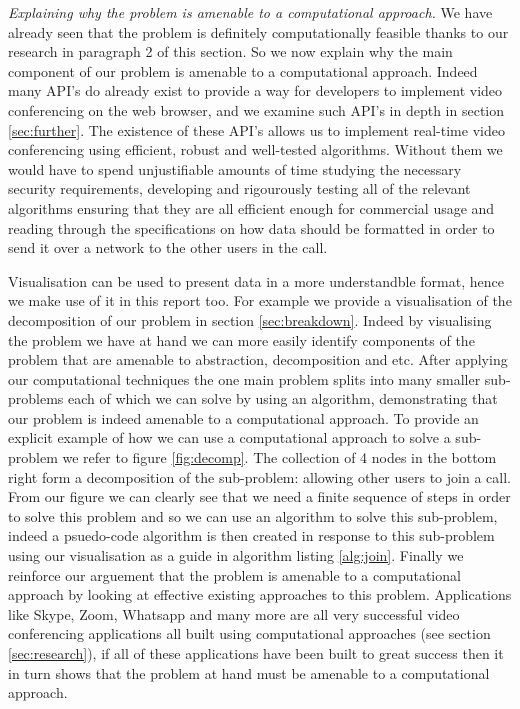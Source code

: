 \textit{Explaining why the problem is amenable to a
computational approach.} We have already seen that the 
problem is definitely computationally feasible thanks to
our research in paragraph 2 of this section. So we now 
explain why the main component of our problem is amenable
to a computational approach. Indeed many API's do already 
exist to provide a way for developers to implement video
conferencing on the web browser, and we examine such API's 
in depth in section \ref{sec:further}. The existence of these 
API's allows us to implement real-time video conferencing
using efficient, robust and well-tested algorithms. Without
them we would have to spend unjustifiable amounts of time 
studying the necessary security requirements, developing and
rigourously testing all of the relevant algorithms ensuring 
that they are all efficient enough for commercial usage and
reading 
through the specifications on how data should be formatted 
in order to send it over a network to the other users in the 
call. \\ \vspace{0.2cm}

Visualisation can be used to present data in a more 
understandble format, hence we make use of it in this report 
too. For example we provide a visualisation of the decomposition
of our problem in section \ref{sec:breakdown}. Indeed by 
visualising the problem we have at hand we can more easily 
identify components of the problem that are amenable to 
abstraction, decomposition and etc. After applying our 
computational techniques the one main problem splits into many
smaller sub-problems each of which we can solve by using an
algorithm, demonstrating that our problem is indeed amenable to 
a computational approach. To provide an explicit example of how 
we can use a computational approach to solve a sub-problem we refer 
to figure \ref{fig:decomp}. The collection of 4 nodes in the
bottom right form a decomposition of the sub-problem: allowing other
users to join a call. From our figure we can clearly see that we
need a finite sequence of steps in order to solve this problem and
so we can use an algorithm to solve this sub-problem, indeed a 
psuedo-code algorithm is then created in response to this sub-problem 
using our visualisation as a guide in algorithm listing \ref{alg:join}.
Finally we reinforce our arguement that the problem is amenable to a
computational approach by looking at effective existing 
approaches to this problem. Applications like Skype, Zoom, 
Whatsapp and many more are all very successful video conferencing
applications all built using computational approaches (see
section \ref{sec:research}), if all of these applications
have been 
built to great success then it in turn shows that the problem 
at hand must be amenable to a computational approach.

